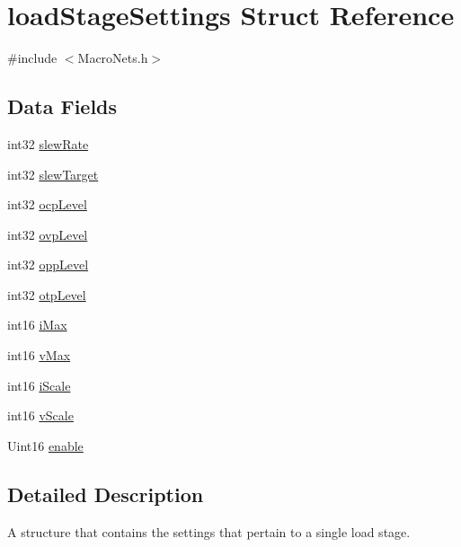 \hypertarget{a00008}{\section{load\-Stage\-Settings Struct Reference}
\label{a00008}
}


{\ttfamily \#include $<$Macro\-Nets.\-h$>$}

\subsection*{Data Fields}
\begin{DoxyCompactItemize}
\item 
int32 \hyperlink{a00008_a8dae50a66a5a7802c4176406bf67eb26}{slew\-Rate}
\item 
int32 \hyperlink{a00008_acc0f896ac1d2a998d480739a13461b19}{slew\-Target}
\item 
int32 \hyperlink{a00008_a0a633f2c0725de044d2eded7d751dd09}{ocp\-Level}
\item 
int32 \hyperlink{a00008_a0f9add3cfd5cacd7ee9473c224b49968}{ovp\-Level}
\item 
int32 \hyperlink{a00008_a85ba8c2f7216bf3517190d9c9c429d63}{opp\-Level}
\item 
int32 \hyperlink{a00008_aa6747ff53a28e2d70f455cbd63ff640a}{otp\-Level}
\item 
int16 \hyperlink{a00008_a8e5919538d441c401e9cb53d50d0bdff}{i\-Max}
\item 
int16 \hyperlink{a00008_a13979ea63b60199c61b1872c03b0a51d}{v\-Max}
\item 
int16 \hyperlink{a00008_ad9dd47136ae5953dff220a935d0aaa45}{i\-Scale}
\item 
int16 \hyperlink{a00008_ad0a53855bdd49163d6556bcef037b7e0}{v\-Scale}
\item 
Uint16 \hyperlink{a00008_af9332d3c3009b081949115a9fdfbcea4}{enable}
\end{DoxyCompactItemize}


\subsection{Detailed Description}
A structure that contains the settings that pertain to a single load stage. 

